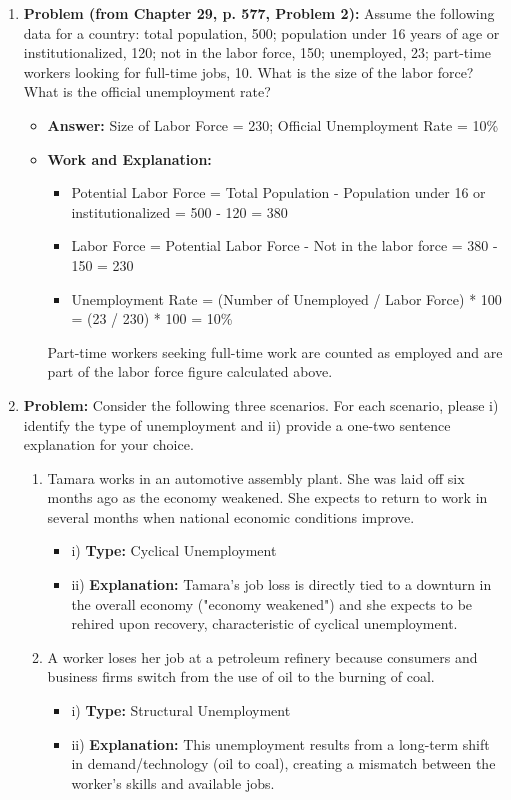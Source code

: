 \documentclass{article}
\begin{document}
\begin{enumerate}[label=\arabic*.]
  \item \textbf{Problem (from Chapter 29, p. 577, Problem 2):} Assume the following data for a country: total population, 500; population under 16 years of age or institutionalized, 120; not in the labor force, 150; unemployed, 23; part-time workers looking for full-time jobs, 10. What is the size of the labor force? What is the official unemployment rate?
    \begin{itemize}
      \item \textbf{Answer:} Size of Labor Force = 230; Official Unemployment Rate = 10\%
      \item \textbf{Work and Explanation:}
        \begin{itemize}
          \item Potential Labor Force = Total Population - Population under 16 or institutionalized = 500 - 120 = 380
          \item Labor Force = Potential Labor Force - Not in the labor force = 380 - 150 = 230
          \item Unemployment Rate = (Number of Unemployed / Labor Force) * 100 = (23 / 230) * 100 = 10\%
        \end{itemize}
        Part-time workers seeking full-time work are counted as employed and are part of the labor force figure calculated above.
    \end{itemize}

\item \textbf{Problem:} Consider the following three scenarios. For each scenario, please i) identify the type of unemployment and ii) provide a one-two sentence explanation for your choice.
\begin{enumerate}[label=\Alph*.]
  \item Tamara works in an automotive assembly plant. She was laid off six months ago as the economy weakened. She expects to return to work in several months when national economic conditions improve.
    \begin{itemize}
    \item i) \textbf{Type:} Cyclical Unemployment
  \item ii) \textbf{Explanation:} Tamara's job loss is directly tied to a downturn in the overall economy ("economy weakened") and she expects to be rehired upon recovery, characteristic of cyclical unemployment.
\end{itemize}
\item A worker loses her job at a petroleum refinery because consumers and business firms switch from the use of oil to the burning of coal.
\begin{itemize}
\item i) \textbf{Type:} Structural Unemployment
\item ii) \textbf{Explanation:} This unemployment results from a long-term shift in demand/technology (oil to coal), creating a mismatch between the worker's skills and available jobs.
\end{itemize}
\end{enumerate}


\end{enumerate}
\end{document}
